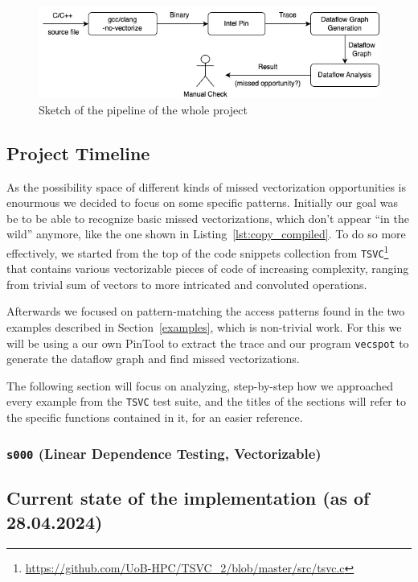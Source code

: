 \documentclass[acmsmall,review, nonacm]{acmart}
\begin{document}
\begin{figure}[h!]
  \includegraphics*[width=0.9\linewidth]{img/pipeline.png}
  \caption{Sketch of the pipeline of the whole project}
  \label{fig:pipeline}
\end{figure}

\subsection*{Project Timeline}
As the possibility space of different kinds of missed vectorization opportunities is enourmous we decided to focus on some specific patterns.
Initially our goal was be to be able to recognize basic missed vectorizations, which don't appear ``in the wild'' anymore, like the one shown in Listing~\ref{lst:copy_compiled}. 
To do so more effectively, we started from the top of the code snippets collection from \texttt{TSVC}\footnote{\url{https://github.com/UoB-HPC/TSVC_2/blob/master/src/tsvc.c}} that contains
various vectorizable pieces of code of increasing complexity, ranging from trivial sum of vectors to more intricated and convoluted operations.

Afterwards we focused on pattern-matching the access patterns found in the two examples described in Section~\ref{examples}, which is non-trivial work.
For this we will be using a our own PinTool to extract the trace and our program 
\texttt{vecspot} to generate the dataflow graph and find missed vectorizations.

The following section will focus on analyzing, step-by-step how we approached every example from the \texttt{TSVC} test suite, 
and the titles of the sections will refer to the specific functions contained in it, for an easier reference.

\subsubsection{\texttt{s000} (Linear Dependence Testing, Vectorizable)}

\subsection{Current state of the implementation (as of 28.04.2024)}
\end{document}
